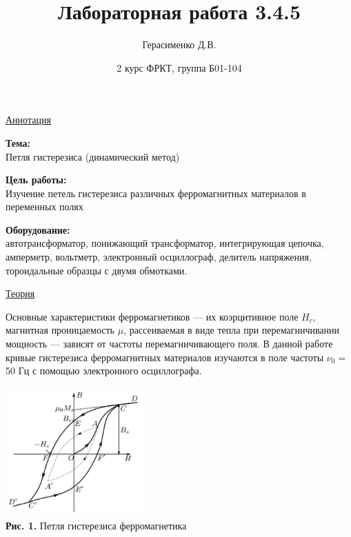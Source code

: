 \documentclass{article}
\title{
    \textbf{Лабораторная работа 3.4.5}
}
\author{Герасименко Д.В.}
\date{2 курс ФРКТ, группа Б01-104}
\begin{document}
\maketitle

\begin{center}
    \raggedleft
        \underline{\underline{\LARGE {Аннотация}}}
\end{center}

\begin{center}
\raggedright
    \large{\textbf{Тема:}}
    \\
    \large {Петля гистерезиса (динамический метод)}
    
    \large{\textbf{Цель работы:}}
    \\
    \large {Изучение петель гистерезиса различных ферромагнитных материалов в переменных полях}
    
    \large{\textbf{Оборудование:}}
    \\
    \large{автотрансформатор, понижающий трансформатор, интегрирующая цепочка, амперметр, вольтметр, электронный
    осциллограф, делитель напряжения, тороидальные образцы с двумя обмотками.}
\end{center}

\begin{center}
    \raggedleft
        \underline{\underline{\LARGE {Теория}}}
\end{center}

Основные характеристики ферромагнетиков — их коэрцитивное поле $H_c$, магнитная проницаемость $\mu$, рассеиваемая в виде тепла при перемагничивании мощность — зависят от частоты перемагничивающего поля. В данной работе кривые гистерезиса ферромагнитных материалов изучаются в поле частоты $\nu_0 =$ 50 Гц с помощью электронного осциллографа.

\begin{center}
    \includegraphics[width = 0.4\textwidth]{petlya.png} \\
	\textbf{Рис. 1.} Петля гистерезиса ферромагнетика
\end{center}
\end{document}

